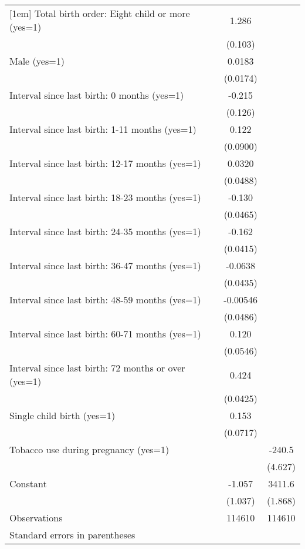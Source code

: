 \begin{tabular}{l*{2}{c}}
[1em]
Total birth order: Eight child or more (yes=1)&       1.286&            \\
                    &     (0.103)&            \\
[1em]
Male (yes=1)        &      0.0183&            \\
                    &    (0.0174)&            \\
[1em]
Interval since last birth: 0 months (yes=1)&      -0.215&            \\
                    &     (0.126)&            \\
[1em]
Interval since last birth: 1-11 months (yes=1)&       0.122&            \\
                    &    (0.0900)&            \\
[1em]
Interval since last birth: 12-17 months (yes=1)&      0.0320&            \\
                    &    (0.0488)&            \\
[1em]
Interval since last birth: 18-23 months (yes=1)&      -0.130&            \\
                    &    (0.0465)&            \\
[1em]
Interval since last birth: 24-35 months (yes=1)&      -0.162&            \\
                    &    (0.0415)&            \\
[1em]
Interval since last birth: 36-47 months (yes=1)&     -0.0638&            \\
                    &    (0.0435)&            \\
[1em]
Interval since last birth: 48-59 months (yes=1)&    -0.00546&            \\
                    &    (0.0486)&            \\
[1em]
Interval since last birth: 60-71 months (yes=1)&       0.120&            \\
                    &    (0.0546)&            \\
[1em]
Interval since last birth: 72 months or over (yes=1)&       0.424&            \\
                    &    (0.0425)&            \\
[1em]
Single child birth (yes=1)&       0.153&            \\
                    &    (0.0717)&            \\
[1em]
Tobacco use during pregnancy (yes=1)&            &      -240.5\\
                    &            &     (4.627)\\
[1em]
Constant            &      -1.057&      3411.6\\
                    &     (1.037)&     (1.868)\\
\hline
Observations        &      114610&      114610\\
\hline\hline
\multicolumn{3}{l}{\footnotesize Standard errors in parentheses}\\
\end{tabular}
